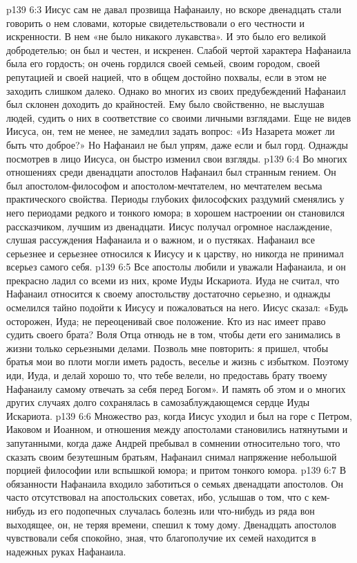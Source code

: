\vs p139 6:3 \pc Иисус сам не давал прозвища Нафанаилу, но вскоре двенадцать стали говорить о нем словами, которые свидетельствовали о его честности и искренности. В нем «не было никакого лукавства». И это было его великой добродетелью; он был и честен, и искренен. Слабой чертой характера Нафанаила была его гордость; он очень гордился своей семьей, своим городом, своей репутацией и своей нацией, что в общем достойно похвалы, если в этом не заходить слишком далеко. Однако во многих из своих предубеждений Нафанаил был склонен доходить до крайностей. Ему было свойственно, не выслушав людей, судить о них в соответствие со своими личными взглядами. Еще не видев Иисуса, он, тем не менее, не замедлил задать вопрос: «Из Назарета может ли быть что доброе?» Но Нафанаил не был упрям, даже если и был горд. Однажды посмотрев в лицо Иисуса, он быстро изменил свои взгляды.
\vs p139 6:4 Во многих отношениях среди двенадцати апостолов Нафанаил был странным гением. Он был апостолом\hyp{}философом и апостолом\hyp{}мечтателем, но мечтателем весьма практического свойства. Периоды глубоких философских раздумий сменялись у него периодами редкого и тонкого юмора; в хорошем настроении он становился рассказчиком, лучшим из двенадцати. Иисус получал огромное наслаждение, слушая рассуждения Нафанаила и о важном, и о пустяках. Нафанаил все серьезнее и серьезнее относился к Иисусу и к царству, но никогда не принимал всерьез самого себя.
\vs p139 6:5 Все апостолы любили и уважали Нафанаила, и он прекрасно ладил со всеми из них, кроме Иуды Искариота. Иуда не считал, что Нафанаил относится к своему апостольству достаточно серьезно, и однажды осмелился тайно подойти к Иисусу и пожаловаться на него. Иисус сказал: «Будь осторожен, Иуда; не переоценивай свое положение. Кто из нас имеет право судить своего брата? Воля Отца отнюдь не в том, чтобы дети его занимались в жизни только серьезными делами. Позволь мне повторить: я пришел, чтобы братья мои во плоти могли иметь радость, веселье и жизнь с избытком. Поэтому иди, Иуда, и делай хорошо то, что тебе велели, но предоставь брату твоему Нафанаилу самому отвечать за себя перед Богом». И память об этом и о многих других случаях долго сохранялась в самозаблуждающемся сердце Иуды Искариота.
\vs p139 6:6 Множество раз, когда Иисус уходил и был на горе с Петром, Иаковом и Иоанном, и отношения между апостолами становились натянутыми и запутанными, когда даже Андрей пребывал в сомнении относительно того, что сказать своим безутешным братьям, Нафанаил снимал напряжение небольшой порцией философии или вспышкой юмора; и притом тонкого юмора.
\vs p139 6:7 В обязанности Нафанаила входило заботиться о семьях двенадцати апостолов. Он часто отсутствовал на апостольских советах, ибо, услышав о том, что с кем\hyp{}нибудь из его подопечных случалась болезнь или что\hyp{}нибудь из ряда вон выходящее, он, не теряя времени, спешил к тому дому. Двенадцать апостолов чувствовали себя спокойно, зная, что благополучие их семей находится в надежных руках Нафанаила.
